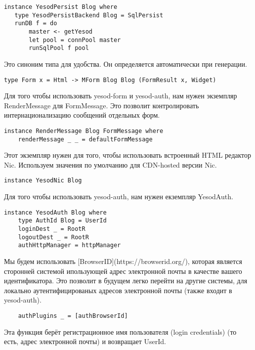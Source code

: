\begin{lstlisting}
instance YesodPersist Blog where
   type YesodPersistBackend Blog = SqlPersist
   runDB f = do 
       master <- getYesod
       let pool = connPool master
       runSqlPool f pool
\end{lstlisting}
 
Это синоним типа для удобства. Он определяется автоматически при генерации. 
 
\begin{lstlisting}
type Form x = Html -> MForm Blog Blog (FormResult x, Widget)
\end{lstlisting}
 
Для того чтобы использовать yesod-form и yesod-auth, нам нужен экземпляр RenderMessage для FormMessage. Это позволит  контролировать интернационализацию сообщений отдельных форм. 
 
\begin{lstlisting}
instance RenderMessage Blog FormMessage where
    renderMessage _ _ = defaultFormMessage
\end{lstlisting}
 
Этот экземпляр нужен для того, чтобы использовать встроенный HTML редактор Nic. Используем значения по умолчанию для CDN-hosted версии Nic. 
 
\begin{lstlisting}
instance YesodNic Blog
\end{lstlisting}
 
Для того чтобы использовать yesod-auth, нам нужен екземпляр YesodAuth. 
 
\begin{lstlisting}
instance YesodAuth Blog where
    type AuthId Blog = UserId
    loginDest _ = RootR
    logoutDest _ = RootR
    authHttpManager = httpManager
\end{lstlisting}
 
Мы будем использовать [BrowserID](https://browserid.org/), которая является сторонней системой ипользующей адрес электронной почты в качестве вашего идентификатора. Это позволит в будущем легко перейти на другие системы, для локально аутентифицированых адресов электронной почты (также входит в yesod-auth). 
 
\begin{lstlisting}
    authPlugins _ = [authBrowserId]
\end{lstlisting}
 
Эта функция берёт регистрационное имя пользователя (login credentials) (то есть, адрес электронной почты) и возвращает UserId. 
 
